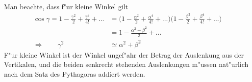 \begin{diskussion}
Man beachte, dass f"ur kleine Winkel gilt
\begin{align*}
\cos\gamma=
1-\frac{\gamma^2}2+\frac{\gamma^4}{4!}+\dots
&=
\biggl(
1-\frac{\alpha^2}2+\frac{\alpha^4}{4!}+\dots
\biggl)
\biggl(
1-\frac{\beta^2}2+\frac{\beta^4}{4!}+\dots
\biggl)
\\
&=
1-\frac{\alpha^2+\beta^2}2+\dots
\\
\Rightarrow\qquad
\gamma^2&\simeq\alpha^2+\beta^2
\end{align*}
F"ur kleine Winkel ist der Winkel ungef"ahr der Betrag der Auslenkung aus der
Vertikalen, und die beiden senkrecht stehenden Auslenkungen m"ussen nat"urlich
nach dem Satz des Pythagoras addiert werden.
\end{diskussion}

